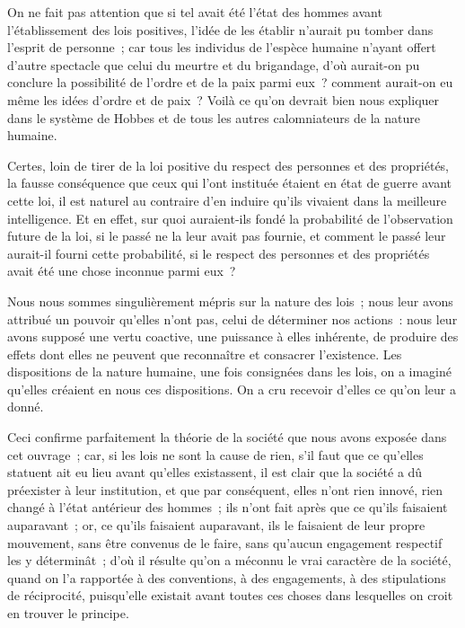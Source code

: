 \documentclass[french,twoside]{book} %
\begin{document}
On ne fait pas attention que si tel avait été l’état des hommes avant l’établissement des lois positives, l’idée de les établir n’aurait pu tomber dans l’esprit de personne ; car tous les individus de l’espèce humaine n’ayant offert d’autre spectacle que celui du meurtre et du brigandage, d’où aurait-on pu conclure la possibilité de l’ordre et de la paix parmi eux ? comment aurait-on eu même les idées d’ordre et de paix ? Voilà ce qu’on devrait bien nous expliquer dans le système de Hobbes et de tous les autres calomniateurs de la nature humaine.\par
Certes, loin de tirer de la loi positive du respect des personnes et des propriétés, la fausse conséquence que ceux qui l’ont instituée étaient en état de guerre avant cette loi, il est naturel au contraire d’en induire qu’ils vivaient dans la meilleure intelligence. Et en effet, sur quoi auraient-ils fondé la probabilité de l’observation future de la loi, si le passé ne la leur avait pas fournie, et comment le passé leur aurait-il fourni cette probabilité, si le respect des personnes et des propriétés avait été une chose inconnue parmi eux {\itshape }?\par
Nous nous sommes singulièrement mépris sur la nature des lois ; nous leur avons attribué un pouvoir qu’elles n’ont pas, celui de déterminer nos actions : nous leur avons supposé une vertu coactive, une puissance à elles inhérente, de produire des effets dont elles ne peuvent que reconnaître et consacrer l’existence. Les dispositions de la nature humaine, une fois consignées dans les lois, on a imaginé qu’elles créaient en nous ces dispositions. On a cru recevoir d’elles ce qu’on leur a donné.\par
Ceci confirme parfaitement la théorie de la société que nous avons exposée dans cet ouvrage ; car, si les lois ne sont la cause de rien, s’il faut que ce qu’elles statuent ait eu lieu avant qu’elles existassent, il est clair que la société a dû préexister à leur institution, et que par conséquent, elles n’ont rien innové, rien changé à l’état antérieur des hommes ; ils n’ont fait après que ce qu’ils faisaient auparavant ; or, ce qu’ils faisaient auparavant, ils le faisaient de leur propre mouvement, sans être convenus de le faire, sans qu’aucun engagement respectif les y déterminât ; d’où il résulte qu’on a méconnu le vrai caractère de la société, quand on l’a rapportée à des conventions, à des engagements, à des stipulations de réciprocité, puisqu’elle existait avant toutes ces choses dans lesquelles on croit en trouver le principe.\par
\end{document}
